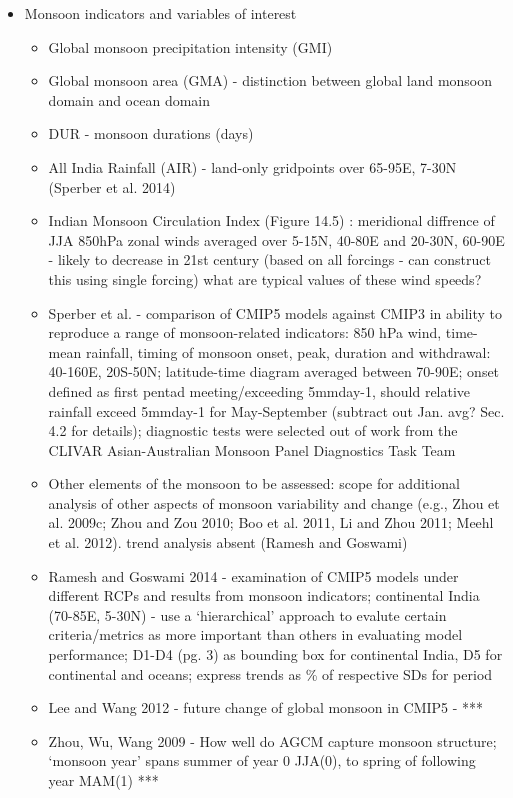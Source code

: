 \documentclass[11pt,reqno]{amsart}
\begin{document}
\begin{itemize}
\item Monsoon indicators and variables of interest
	\begin{itemize}
		\item Global monsoon precipitation intensity (GMI)
		\item Global monsoon area (GMA) - distinction between global land monsoon domain and ocean domain 
		\item DUR - monsoon durations (days) 
		\item All India Rainfall (AIR) - land-only gridpoints over 65-95E, 7-30N (Sperber et al. 2014)
		\item Indian Monsoon Circulation Index (Figure 14.5) : meridional diffrence of JJA 850hPa zonal winds averaged over 5-15N, 40-80E and 20-30N, 60-90E - likely to decrease in 21st century (based on all forcings - can construct this using single forcing) what are typical values of these wind speeds?
		\item Sperber et al. - comparison of CMIP5 models against CMIP3 in ability to reproduce a range of monsoon-related indicators: 850 hPa wind, time-mean rainfall, timing of monsoon onset, peak, duration and withdrawal: 40-160E, 20S-50N; latitude-time diagram averaged between 70-90E; onset defined as first pentad meeting/exceeding 5mmday-1, should relative  rainfall exceed 5mmday-1 for May-September (subtract out Jan. avg? Sec. 4.2 for details); diagnostic tests were selected out of work from the CLIVAR Asian-Australian Monsoon Panel Diagnostics Task Team 
		\item Other elements of the monsoon to be assessed: scope for additional analysis of other aspects of monsoon variability and change (e.g., Zhou et al. 2009c; Zhou and Zou 2010; Boo et al. 2011, Li and Zhou 2011; Meehl et al. 2012).  trend analysis absent (Ramesh and Goswami)
		\item Ramesh and Goswami 2014 - examination of CMIP5 models under different RCPs and results from monsoon indicators; continental India (70-85E, 5-30N) - use a `hierarchical' approach to evalute certain criteria/metrics as more important than others in evaluating model performance; D1-D4 (pg. 3) as bounding box for continental India, D5 for continental and oceans; express trends as \% of respective SDs for period 
		\item Lee and Wang 2012 - future change of global monsoon in CMIP5 -  ***
		\item Zhou, Wu, Wang 2009 - How well do AGCM capture monsoon structure; `monsoon year' spans summer of year 0 JJA(0), to spring of following year MAM(1) *** 

\end{itemize}
\end{itemize}
\end{document}
